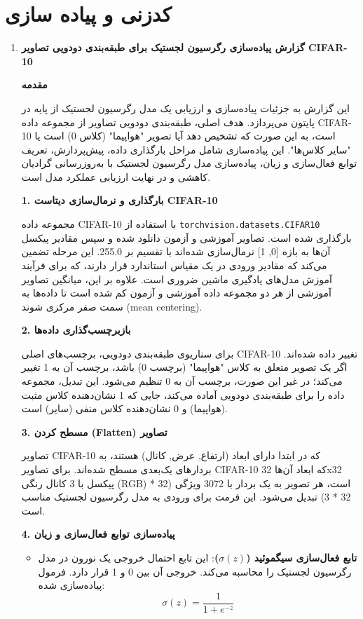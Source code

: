 \section{ کدزنی و پیاده سازی‬}
\begin{enumerate}
	\item \textbf{گزارش پیاده‌سازی رگرسیون لجستیک برای طبقه‌بندی دودویی تصاویر CIFAR-10}
	
	\textbf{مقدمه}
	
	این گزارش به جزئیات پیاده‌سازی و ارزیابی یک مدل رگرسیون لجستیک از پایه در پایتون می‌پردازد. هدف اصلی، طبقه‌بندی دودویی تصاویر از مجموعه داده CIFAR-10 است، به این صورت که تشخیص دهد آیا تصویر "هواپیما" (کلاس 0) است یا "سایر کلاس‌ها". این پیاده‌سازی شامل مراحل بارگذاری داده، پیش‌پردازش، تعریف توابع فعال‌سازی و زیان، پیاده‌سازی مدل رگرسیون لجستیک با به‌روزرسانی گرادیان کاهشی و در نهایت ارزیابی عملکرد مدل است.
	
	\textbf{1. بارگذاری و نرمال‌سازی دیتاست CIFAR-10}
	
	مجموعه داده CIFAR-10 با استفاده از \texttt{torchvision.datasets.CIFAR10} بارگذاری شده است. تصاویر آموزشی و آزمون دانلود شده و سپس مقادیر پیکسل آن‌ها به بازه [0, 1] نرمال‌سازی شده‌اند با تقسیم بر 255.0. این مرحله تضمین می‌کند که مقادیر ورودی در یک مقیاس استاندارد قرار دارند، که برای فرآیند آموزش مدل‌های یادگیری ماشین ضروری است. علاوه بر این، میانگین تصاویر آموزشی از هر دو مجموعه داده آموزشی و آزمون کم شده است تا داده‌ها به سمت صفر مرکزی شوند (mean centering).
	
	\textbf{2. بازبرچسب‌گذاری داده‌ها}
	
	برای سناریوی طبقه‌بندی دودویی، برچسب‌های اصلی CIFAR-10 تغییر داده شده‌اند. اگر یک تصویر متعلق به کلاس "هواپیما" (برچسب 0) باشد، برچسب آن به 1 تغییر می‌کند؛ در غیر این صورت، برچسب آن به 0 تنظیم می‌شود. این تبدیل، مجموعه داده را برای طبقه‌بندی دودویی آماده می‌کند، جایی که 1 نشان‌دهنده کلاس مثبت (هواپیما) و 0 نشان‌دهنده کلاس منفی (سایر) است.
	
	\textbf{3. مسطح کردن (Flatten) تصاویر}
	
	تصاویر CIFAR-10 که در ابتدا دارای ابعاد (ارتفاع, عرض, کانال) هستند، به بردارهای یک‌بعدی مسطح شده‌اند. برای تصاویر CIFAR-10 که ابعاد آن‌ها 32x32 پیکسل با 3 کانال رنگی (RGB) است، هر تصویر به یک بردار با 3072 ویژگی (32 * 32 * 3) تبدیل می‌شود. این فرمت برای ورودی به مدل رگرسیون لجستیک مناسب است.
	
	\textbf{4. پیاده‌سازی توابع فعال‌سازی و زیان}
	
	\begin{itemize}
		\item \textbf{تابع فعال‌سازی سیگموئید ($\sigma(z)$)}: این تابع احتمال خروجی یک نورون در مدل رگرسیون لجستیک را محاسبه می‌کند. خروجی آن بین 0 و 1 قرار دارد. فرمول پیاده‌سازی شده:
		$$\sigma(z) = \frac{1}{1 + e^{-z}}$$
		

\end{itemize}
\end{enumerate}

